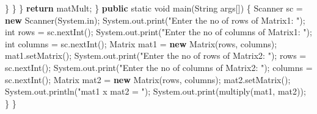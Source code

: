 \documentclass[
  12pt,
]{article}
\newenvironment{Shaded}{}{}
\newcommand{\BuiltInTok}[1]{\textcolor[rgb]{0.00,0.50,0.00}{#1}}
\newcommand{\ControlFlowTok}[1]{\textcolor[rgb]{0.00,0.44,0.13}{\textbf{#1}}}
\newcommand{\DataTypeTok}[1]{\textcolor[rgb]{0.56,0.13,0.00}{#1}}
\newcommand{\FunctionTok}[1]{\textcolor[rgb]{0.02,0.16,0.49}{#1}}
\newcommand{\KeywordTok}[1]{\textcolor[rgb]{0.00,0.44,0.13}{\textbf{#1}}}
\newcommand{\NormalTok}[1]{#1}
\newcommand{\OperatorTok}[1]{\textcolor[rgb]{0.40,0.40,0.40}{#1}}
\newcommand{\StringTok}[1]{\textcolor[rgb]{0.25,0.44,0.63}{#1}}
\begin{document}
\begin{Shaded}
\begin{Highlighting}[numbers=left,,]
                \OperatorTok{\}}
            \OperatorTok{\}}
        \OperatorTok{\}}
        \ControlFlowTok{return}\NormalTok{ matMult}\OperatorTok{;}
    \OperatorTok{\}}
    \KeywordTok{public} \DataTypeTok{static} \DataTypeTok{void} \FunctionTok{main}\OperatorTok{(}\BuiltInTok{String}\NormalTok{ args}\OperatorTok{[])}
    \OperatorTok{\{}
        \BuiltInTok{Scanner}\NormalTok{ sc }\OperatorTok{=} \KeywordTok{new} \BuiltInTok{Scanner}\OperatorTok{(}\BuiltInTok{System}\OperatorTok{.}\FunctionTok{in}\OperatorTok{);}
        \BuiltInTok{System}\OperatorTok{.}\FunctionTok{out}\OperatorTok{.}\FunctionTok{print}\OperatorTok{(}\StringTok{"Enter the no of rows of Matrix1: "}\OperatorTok{);}
        \DataTypeTok{int}\NormalTok{ rows }\OperatorTok{=}\NormalTok{ sc}\OperatorTok{.}\FunctionTok{nextInt}\OperatorTok{();}
        \BuiltInTok{System}\OperatorTok{.}\FunctionTok{out}\OperatorTok{.}\FunctionTok{print}\OperatorTok{(}\StringTok{"Enter the no of columns of Matrix1: "}\OperatorTok{);}
        \DataTypeTok{int}\NormalTok{ columns }\OperatorTok{=}\NormalTok{ sc}\OperatorTok{.}\FunctionTok{nextInt}\OperatorTok{();}
\NormalTok{        Matrix mat1 }\OperatorTok{=} \KeywordTok{new} \FunctionTok{Matrix}\OperatorTok{(}\NormalTok{rows}\OperatorTok{,}\NormalTok{ columns}\OperatorTok{);}
\NormalTok{        mat1}\OperatorTok{.}\FunctionTok{setMatrix}\OperatorTok{();}
        \BuiltInTok{System}\OperatorTok{.}\FunctionTok{out}\OperatorTok{.}\FunctionTok{print}\OperatorTok{(}\StringTok{"Enter the no of rows of Matrix2: "}\OperatorTok{);}
\NormalTok{        rows }\OperatorTok{=}\NormalTok{ sc}\OperatorTok{.}\FunctionTok{nextInt}\OperatorTok{();}
        \BuiltInTok{System}\OperatorTok{.}\FunctionTok{out}\OperatorTok{.}\FunctionTok{print}\OperatorTok{(}\StringTok{"Enter the no of columns of Matrix2: "}\OperatorTok{);}
\NormalTok{        columns }\OperatorTok{=}\NormalTok{ sc}\OperatorTok{.}\FunctionTok{nextInt}\OperatorTok{();}
\NormalTok{        Matrix mat2 }\OperatorTok{=} \KeywordTok{new} \FunctionTok{Matrix}\OperatorTok{(}\NormalTok{rows}\OperatorTok{,}\NormalTok{ columns}\OperatorTok{);}
\NormalTok{        mat2}\OperatorTok{.}\FunctionTok{setMatrix}\OperatorTok{();}
        \BuiltInTok{System}\OperatorTok{.}\FunctionTok{out}\OperatorTok{.}\FunctionTok{println}\OperatorTok{(}\StringTok{"mat1 x mat2 = "}\OperatorTok{);}
        \BuiltInTok{System}\OperatorTok{.}\FunctionTok{out}\OperatorTok{.}\FunctionTok{print}\OperatorTok{(}\FunctionTok{multiply}\OperatorTok{(}\NormalTok{mat1}\OperatorTok{,}\NormalTok{ mat2}\OperatorTok{));}
    \OperatorTok{\}}
\OperatorTok{\}}
\end{Highlighting}
\end{Shaded}
\end{document}
